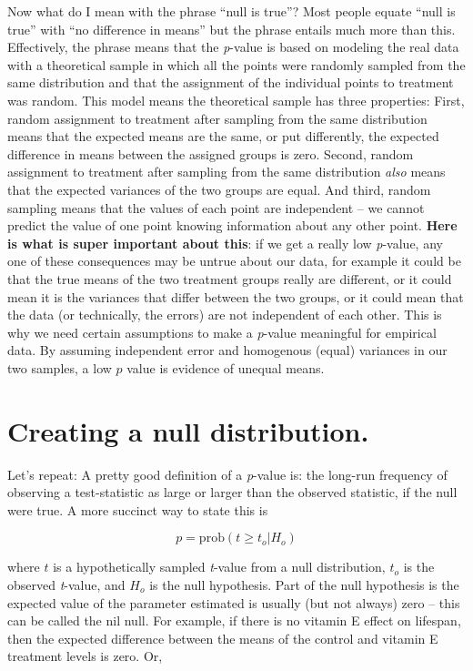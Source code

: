 \documentclass[]{book}
\begin{document}
Now what do I mean with the phrase ``null is true''? Most people equate
``null is true'' with ``no difference in means'' but the phrase entails
much more than this. Effectively, the phrase means that the
\emph{p}-value is based on modeling the real data with a theoretical
sample in which all the points were randomly sampled from the same
distribution and that the assignment of the individual points to
treatment was random. This model means the theoretical sample has three
properties: First, random assignment to treatment after sampling from
the same distribution means that the expected means are the same, or put
differently, the expected difference in means between the assigned
groups is zero. Second, random assignment to treatment after sampling
from the same distribution \emph{also} means that the expected variances
of the two groups are equal. And third, random sampling means that the
values of each point are independent -- we cannot predict the value of
one point knowing information about any other point. \textbf{Here is
what is super important about this}: if we get a really low
\emph{p}-value, any one of these consequences may be untrue about our
data, for example it could be that the true means of the two treatment
groups really are different, or it could mean it is the variances that
differ between the two groups, or it could mean that the data (or
technically, the errors) are not independent of each other. This is why
we need certain assumptions to make a \emph{p}-value meaningful for
empirical data. By assuming independent error and homogenous (equal)
variances in our two samples, a low \(p\) value is evidence of unequal
means.

\section{Creating a null
distribution.}\label{creating-a-null-distribution.}

Let's repeat: A pretty good definition of a \emph{p}-value is: the
long-run frequency of observing a test-statistic as large or larger than
the observed statistic, if the null were true. A more succinct way to
state this is

\begin{equation}
p = \mathrm{prob}(t \ge t_o | H_o)
\end{equation}

where \(t\) is a hypothetically sampled \emph{t}-value from a null
distribution, \(t_o\) is the observed \emph{t}-value, and \(H_o\) is the
null hypothesis. Part of the null hypothesis is the expected value of
the parameter estimated is usually (but not always) zero -- this can be
called the nil null. For example, if there is no vitamin E effect on
lifespan, then the expected difference between the means of the control
and vitamin E treatment levels is zero. Or,
\end{document}
